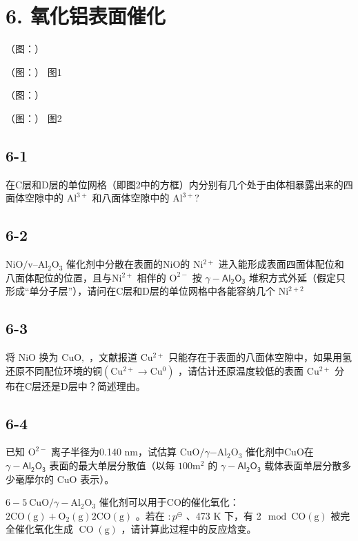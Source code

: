 \section*{6. 氧化铝表面催化}
（图：）

（图：）
图1

（图：）

（图：）
图2

\subsection*{6-1}
在C层和D层的单位⽹格（即图2中的⽅框）内分别有⼏个处于由体相暴露出来的四⾯体空隙中的 $\mathrm { A l ^ { 3 + } }$ 和⼋⾯体空隙中的 $\mathrm { A l ^ { 3 + } } ?$

\subsection*{6-2}
$\mathrm { N i O / v  – A l _ { 2 } O _ { 3 } }$ 催化剂中分散在表⾯的NiO的 $\mathrm { N i ^ { 2 + } }$ 进⼊能形成表⾯四⾯体配位和⼋⾯体配位的位置，且与$\mathrm { N i ^ { 2 + } }$ 相伴的 $\mathrm { O ^ { 2 - } }$ 按 $\mathsf { \gamma { - } A l _ { 2 } O _ { 3 } }$ 堆积⽅式外延（假定只形成“单分⼦层”），请问在C层和D层的单位⽹格中各能容纳⼏个 $\mathrm { N i ^ { 2 + 2 } }$

\subsection*{6-3}
将 NiO 换为 ${ \mathrm { C u O } } ,$ ，⽂献报道 $\mathrm { C u ^ { 2 + } }$ 只能存在于表⾯的⼋⾯体空隙中，如果⽤氢还原不同配位环境的铜$( \mathrm { C u ^ { 2 + } \to C u ^ { 0 } } )$ ，请估计还原温度较低的表⾯ $\mathrm { C u ^ { 2 + } }$ 分布在C层还是D层中？简述理由。

\subsection*{6-4}
已知 $\mathrm { O ^ { 2 - } }$ 离⼦半径为0.140 nm，试估算 $\mathrm { C u O } / \gamma \mathrm { - A l _ { 2 } O _ { 3 } }$ 催化剂中CuO在 $\mathsf { \gamma { - } A l _ { 2 } O _ { 3 } }$ 表⾯的最⼤单层分散值（以每 $1 0 0 \mathrm { m ^ { 2 } }$ 的 $\mathsf { \gamma { - } A l _ { 2 } O _ { 3 } }$ 载体表⾯单层分散多少毫摩尔的 $\mathrm { C u O }$ 表⽰）。

${ 6 { - } 5 } \mathrm { \ C u O } / \gamma { - } \mathrm { A l } _ { 2 } \mathrm { O } _ { 3 }$ 催化剂可以⽤于CO的催化氧化： $2 \mathrm { C O } ( \mathrm { g } ) + \mathrm { O } _ { 2 } ( \mathrm { g } )  2 \mathrm { C O } ( \mathrm { g } )$ 。若在 $: p ^ { \ominus }$ 、473 K 下，有 2$\mod \mathrm { C O ( g ) }$ 被完全催化氧化⽣成 $\operatorname { C O } ( \mathrm { g } )$ ，请计算此过程中的反应焓变。

